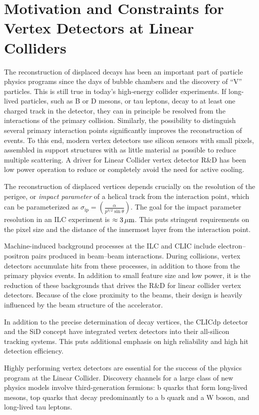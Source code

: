 \section{Motivation and Constraints for Vertex Detectors at Linear Colliders}

The reconstruction of displaced decays has been an important part of particle physics programs since the days of bubble chambers and the discovery of ``V'' particles. This is still true in today's high-energy collider experiments. If long-lived particles, such as B or D mesons, or tau leptons, decay to at least one charged track in the detector, they can in principle be resolved from the interactions of the primary collision. Similarly, the possibility to distinguish several primary interaction points significantly improves the reconstruction of events. To this end, modern vertex detectors use silicon sensors with small pixels, assembled in support structures with as little material as possible to reduce multiple scattering. A driver for Linear Collider vertex detector R\&D has been low power operation to reduce or completely avoid the need for active cooling.

The reconstruction of displaced vertices depends crucially on the resolution of the perigee, or \emph{impact parameter} of a helical track from the interaction point, which can be parameterized as $\sigma_\text{ip} = \left(\frac{\alpha}{p^{3/2}\sin\theta}\right).$
The goal for the impact parameter resolution in an ILC experiment is $\approx\unit[3]{\micron}$. This puts stringent requirements on the pixel size and the distance of the innermost layer from the interaction point.

Machine-induced background processes at the ILC and CLIC include electron--positron pairs produced in beam--beam interactions. During collisions, vertex detectors accumulate hits from these processes, in addition to those from the primary physics events. In addition to small feature size and low power, it is the reduction of these backgrounds that drives the R\&D for linear collider vertex detectors. Because of the close proximity to the beams, their design is heavily influenced by the beam structure of the accelerator.

In addition to the precise determination of decay vertices, the CLICdp detector and the SiD concept have integrated vertex detectors into their all-silicon tracking systems. This puts additional emphasis on high reliability and high hit detection efficiency.

Highly performing vertex detectors are essential for the success of the physics program at the Linear Collider. Discovery channels for a large class of new physics models involve third-generation fermions: b quarks that form long-lived mesons, top quarks that decay predominantly to a b quark and a W boson, and long-lived tau leptons.
